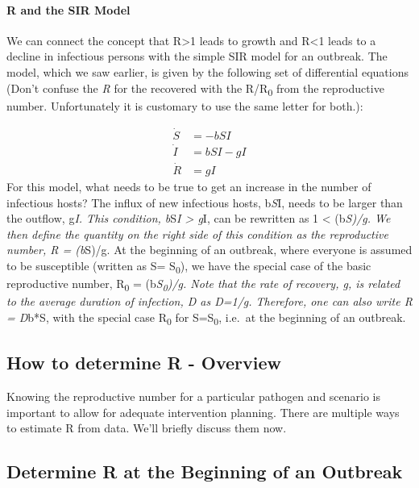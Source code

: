 \documentclass[]{article}
\let\oldparagraph\paragraph
\renewcommand{\paragraph}[1]{\oldparagraph{#1}\mbox{}}
\theoremstyle{definition}
\theoremstyle{definition}
\theoremstyle{definition}
\theoremstyle{remark}
\begin{document}
\paragraph{R and the SIR Model}\label{myadvancedbox}

We can connect the concept that R\textgreater{}1 leads to growth and
R\textless{}1 leads to a decline in infectious persons with the simple
SIR model for an outbreak. The model, which we saw earlier, is given by
the following set of differential equations (Don't confuse the \emph{R}
for the recovered with the R/R\textsubscript{0} from the reproductive
number. Unfortunately it is customary to use the same letter for both.):

\[ 
\begin{aligned}
\dot S &= - b SI \\
\dot I &= b S I - g I \\
\dot R &= g I
\end{aligned}
\] For this model, what needs to be true to get an increase in the
number of infectious hosts? The influx of new infectious hosts,
b\emph{S}I, needs to be larger than the outflow, g\emph{I. This
condition, b}S\emph{I \textgreater{} g}I, can be rewritten as 1
\textless{} (b\emph{S)/g. We then define the quantity on the right side
of this condition as the reproductive number, R = (b}S)/g. At the
beginning of an outbreak, where everyone is assumed to be susceptible
(written as S= S\textsubscript{0}), we have the special case of the
basic reproductive number, R\textsubscript{0} =
(b\emph{S\textsubscript{0})/g. Note that the rate of recovery, g, is
related to the average duration of infection, D as D=1/g. Therefore, one
can also write R = D}b*S, with the special case R\textsubscript{0} for
S=S\textsubscript{0}, i.e.~at the beginning of an outbreak.

\subsection{How to determine R -
Overview}\label{how-to-determine-r---overview}

Knowing the reproductive number for a particular pathogen and scenario
is important to allow for adequate intervention planning. There are
multiple ways to estimate R from data. We'll briefly discuss them now.

\subsection{Determine R at the Beginning of an
Outbreak}\label{determine-r-at-the-beginning-of-an-outbreak}
\end{document}
